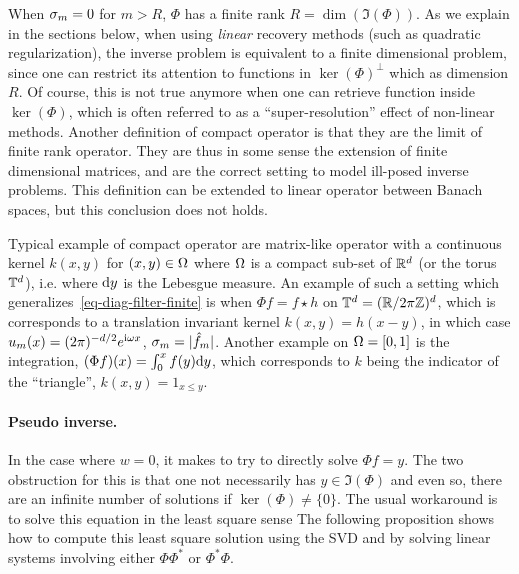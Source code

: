 When $\sigma_m=0$ for $m>R$, $\Phi$ has a finite rank $R=\dim(\Im(\Phi))$. As we explain in the sections below, when using \textit{linear} recovery methods (such as quadratic regularization), the inverse problem is equivalent to a finite dimensional problem, since one can restrict its attention to functions in $\ker(\Phi)^\bot$ which as dimension $R$. Of course, this is not true anymore when one can retrieve function inside $\ker(\Phi)$, which is often referred to as a ``super-resolution'' effect of non-linear methods.
%
Another definition of compact operator is that they are the limit of finite rank operator. They are thus in some sense the extension of finite dimensional matrices, and are the correct setting to model ill-posed inverse problems. This definition can be extended to linear operator between Banach spaces, but this conclusion does not holds.

Typical example of compact operator are matrix-like operator with a continuous kernel $k(x,y)$ for $(x,y) \in \Omega$ where $\Omega$ is a compact sub-set of $\mathbb{R}^d$ (or the torus $\mathbb{T}^d$), i.e.
where $\mathrm{d} y$ is the Lebesgue measure. 
%
An example of such a setting which generalizes~\eqref{eq-diag-filter-finite} is when $\Phi f = f \star h$ on $\mathbb{T}^d=(\mathbb{R}/2\pi\mathbb{Z})^d$, which is corresponds to a translation invariant kernel $k(x,y) = h(x-y)$, in which case $u_m(x)=(2\pi)^{-d/2} e^{\mathrm{i} \omega x}$, $\sigma_m = |\hat f_m|$.
% 
Another example on $\Omega=[0,1]$ is the integration, $(\Phi f)(x) = \int_{0}^x f(y) \mathrm{d} y$, which corresponds to $k$ being the indicator of the ``triangle'', $k(x,y)=1_{x \leq y}$.



\paragraph{Pseudo inverse.}

In the case where $w=0$, it makes to try to directly solve $\Phi f = y$. The two obstruction for this is that one not necessarily has $y \in \Im(\Phi)$ and even so, there are an infinite number of solutions if $\ker(\Phi) \neq \{0\}$. The usual workaround is to solve this equation in the least square sense 
The following proposition shows how to compute this least square solution using the SVD and by solving linear systems involving either $\Phi\Phi^*$ or $\Phi^*\Phi$. 

